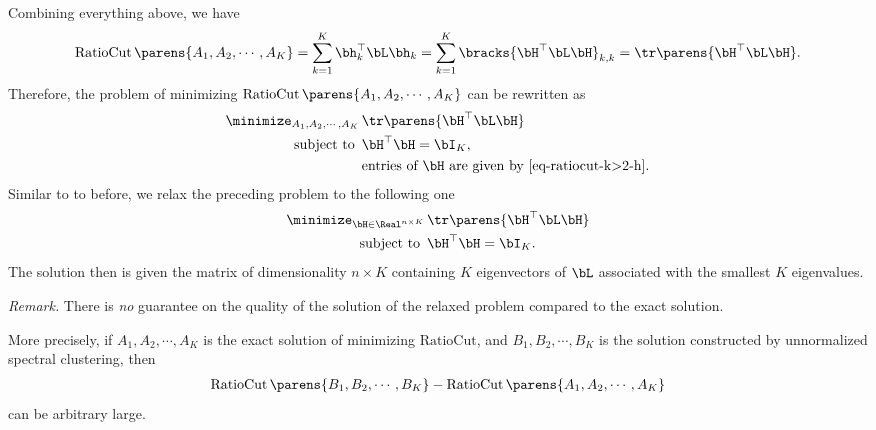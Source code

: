 \documentclass[12pt]{article}
\begin{document}
\begin{enumerate}[label=\textbf{\arabic*.}]
\begin{enumerate}
		Combining everything above, we have 
		\begin{align*}
			\mathrm{RatioCut} \, \parens{A_1, A_2, \cdots, A_K} = \sum_{k=1}^K \bh_k^\top \bL \bh_k = \sum_{k=1}^K \bracks{\bH^\top \bL \bH}_{k, k} = \tr \parens{\bH^\top \bL \bH}. 
		\end{align*}
		Therefore, the problem of minimizing $\mathrm{RatioCut} \, \parens{A_1, A_2, \cdots, A_K}$ can be rewritten as 
		\begin{align*}
			\minimize_{A_1, A_2, \cdots, A_K} & \, \tr \parens{\bH^\top \bL \bH} \\ 
			\text{ subject to } & \, \bH^\top \bH = \bI_K, \\ 
			& \, \text{entries of $\bH$ are given by \eqref{eq-ratiocut-k>2-h}}. 
		\end{align*}
		Similar to to before, we relax the preceding problem to the following one 
		\begin{align*}
			\minimize_{\bH \in \Real^{n \times K}} & \, \tr \parens{\bH^\top \bL \bH} \\ 
			\text{ subject to } & \, \bH^\top \bH = \bI_K. 
		\end{align*}
		The solution then is given the matrix of dimensionality $n \times K$ containing $K$ eigenvectors of $\bL$ associated with the smallest $K$ eigenvalues. 
		
		\textit{Remark.} There is \emph{no} guarantee on the quality of the solution of the relaxed problem compared to the exact solution. 
		
		More precisely, if $A_1, A_2, \cdots, A_K$ is the exact solution of minimizing $\mathrm{RatioCut}$, and $B_1, B_2, \cdots, B_K$ is the solution constructed by unnormalized spectral clustering, then 
		\begin{align*}
			\mathrm{RatioCut} \, \parens{B_1, B_2, \cdots, B_K} - \mathrm{RatioCut} \, \parens{A_1, A_2, \cdots, A_K}
		\end{align*}
		can be arbitrary large. 
		

\end{enumerate}
\end{enumerate}
\end{document}
